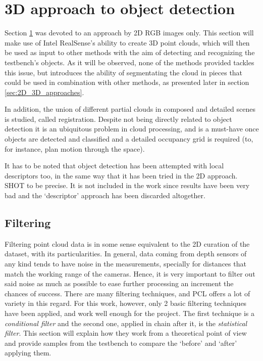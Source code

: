 \documentclass[../main.tex]{subfiles}
\begin{document}
\section{3D approach to object detection} \label{sec:3D_approach}
Section \ref{sec:3D_approach} was devoted to an approach by 2D RGB images only. This section will make use of Intel RealSense's ability to create 3D point clouds, which will then be used as input to other methods with the aim of detecting and recognizing the testbench's objects. As it will be observed, none of the methods provided tackles this issue, but introduces the ability of segmentating the cloud in pieces that could be used in combination with other methods, as presented later in section \ref{sec:2D_3D_approaches}.

In addition, the union of different partial clouds in composed and detailed scenes is studied, called registration. Despite not being directly related to object detection it is an ubiquitous problem in cloud processing, and is a must-have once objects are detected and classified and a detailed occupancy grid is required (to, for instance, plan motion through the space).

It has to be noted that object detection has been attempted with local descriptors too, in the same way that it has been tried in the 2D approach. SHOT \cite{Salti2014SHOTUS} to be precise. It is not included in the work since results have been very bad and the `descriptor' approach has been discarded altogether.

\subsection{Filtering}
Filtering point cloud data is in some sense equivalent to the 2D curation of the dataset, with its particularities. In general, data coming from depth sensors of any kind tends to have noise in the measurements, specially for distances that match the working range of the cameras. Hence, it is very important to filter out said noise as much as possible to ease further processing an increment the chances of success. There are many filtering techniques, and PCL offers a lot of variety in this regard. For this work, however, only 2 basic filtering techniques have been applied, and work well enough for the project. The first technique is a \emph{conditional filter} and the second one, applied in chain after it, is the \emph{statistical filter}. This section will explain how they work from a theoretical point of view and provide samples from the testbench to compare the `before' and `after' applying them.
\end{document}
